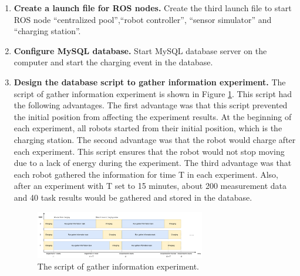 \begin{enumerate}
 \item \textbf{Create a launch file for ROS nodes.} Create the third launch file to start ROS node ``centralized pool'',``robot controller'', ``sensor simulator'' and ``charging station''. 
 \item \textbf{Configure MySQL database.} Start MySQL database server on the computer and start the charging event in the database.
 \item \textbf{Design the database script to gather information experiment.} The script of gather information experiment is shown in Figure \ref{fig:env_exp_timeline}. This script had the following advantages. The first advantage was that this script prevented the initial position from affecting the experiment results. At the beginning of each experiment, all robots started from their initial position, which is the charging station. The second advantage was that the robot would charge after each experiment. This script ensures that the robot would not stop moving due to a lack of energy during the experiment. The third advantage was that each robot gathered the information for time T in each experiment. Also, after an experiment with T set to 15 minutes, about 200 measurement data and 40 task results would be gathered and stored in the database. 
 \begin{figure}[htbp]
    \centering
    \includegraphics[width = 0.7\textwidth]{content/images/ch5/env_exp_timeline.drawio.png}
    \caption{The script of gather information experiment.}
    \label{fig:env_exp_timeline}
 \end{figure}


\end{enumerate}
